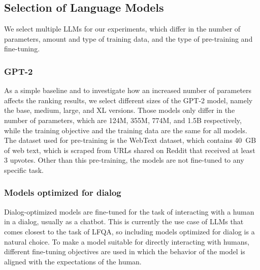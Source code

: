 \subsection{Selection of Language Models}
We select multiple LLMs for our experiments, which differ in the number of parameters, amount and type of training data, and the type of pre-training and fine-tuning.

\subsubsection{GPT-2}
As a simple baseline and to investigate how an increased number of parameters affects the ranking results, we select different sizes of the GPT-2 model, namely the base, medium, large, and XL versions.
Those models only differ in the number of parameters, which are 124M, 355M, 774M, and 1.5B respectively, while the training objective and the training data are the same for all models.
The dataset used for pre-training is the WebText dataset, which contains 40 GB of web text, which is scraped from URLs shared on Reddit that received at least 3 upvotes.
Other than this pre-training, the models are not fine-tuned to any specific task.

\subsubsection{Models optimized for dialog}\label{sec:dialog-models}
Dialog-optimized models are fine-tuned for the task of interacting with a human in a dialog, usually as a chatbot.
This is currently the use case of LLMs that comes closest to the task of LFQA, so including models optimized for dialog is a natural choice.
To make a model suitable for directly interacting with humans, different fine-tuning objectives are used in which the behavior of the model is aligned with the expectations of the human.

